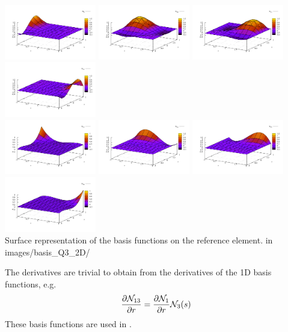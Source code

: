 \begin{center}
\includegraphics[width=4cm]{images/basis_Q3_2D/N9}
\includegraphics[width=4cm]{images/basis_Q3_2D/N10}
\includegraphics[width=4cm]{images/basis_Q3_2D/N11}
\includegraphics[width=4cm]{images/basis_Q3_2D/N12}\\
\includegraphics[width=4cm]{images/basis_Q3_2D/N13}
\includegraphics[width=4cm]{images/basis_Q3_2D/N14}
\includegraphics[width=4cm]{images/basis_Q3_2D/N15}
\includegraphics[width=4cm]{images/basis_Q3_2D/N16}\\
{\captionfont Surface representation of the basis functions on the reference element.
{\color{gray} in images/basis\_Q3\_2D/ }}
\end{center}
The derivatives are trivial to obtain from the derivatives of the 1D basis functions, 
e.g.
\[
\frac{\partial {\mathcal{N}}_{13}}{\partial r} = 
\frac{\partial {\mathcal{N}}_{1}}{\partial r} {\mathcal{N}}_3(s) 
\]
These basis functions are used in .
